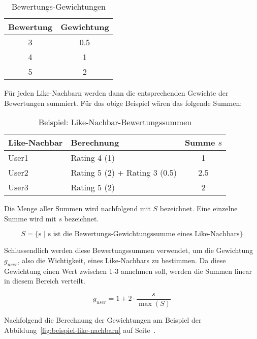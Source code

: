 \documentclass[10pt,a4paper]{scrartcl}
\begin{document}
\begin{table}[H]
	\begin{center}
		\begin{tabular}{cc}
			\toprule
			Bewertung & Gewichtung \\
			\midrule
			3 & 0.5 \\
			4 & 1 \\
			5 & 2 \\
			\bottomrule
		\end{tabular}
	\end{center}
	\caption{Bewertungs-Gewichtungen}
	\label{table:bewertungs-gewichtungen}
\end{table}

Für jeden Like-Nachbarn werden dann die entsprechenden Gewichte der Bewertungen summiert. Für
das obige Beispiel wären das folgende Summen:

\begin{table}[H]
	\begin{center}
		\begin{tabular}{llc}
			\toprule
			Like-Nachbar & Berechnung & Summe $s$ \\
			\midrule
			User1 & Rating 4 (1) & 1 \\
			User2 & Rating 5 (2) + Rating 3 (0.5) & 2.5 \\
			User3 & Rating 5 (2) & 2 \\
			\bottomrule
		\end{tabular}
	\end{center}
	\label{table:like-nachbar-bewertungssummen}
	\caption{Beispiel: Like-Nachbar-Bewertungssummen}
\end{table}

Die Menge aller Summen wird nachfolgend mit $S$ bezeichnet. Eine einzelne Summe wird mit $s$
bezeichnet.

$$S = \{ \textrm{s $|$ s ist die Bewertungs-Gewichtungssumme eines Like-Nachbars} \}$$

Schlussendlich werden diese Bewertungssummen verwendet, um die Gewichtung $g_{user}$, also die
Wichtigkeit, eines Like-Nachbars zu bestimmen. Da diese Gewichtung einen Wert zwischen 1-3 annehmen
soll, werden die Summen linear in diesem Bereich verteilt.

$$g_{user} = 1 + 2 \cdot \frac{s}{\max(S)}$$

Nachfolgend die Berechnung der Gewichtungen am Beispiel der Abbildung~\ref{fig:beispiel-like-nachbarn}
auf Seite~\pageref{fig:beispiel-like-nachbarn}.
\end{document}
